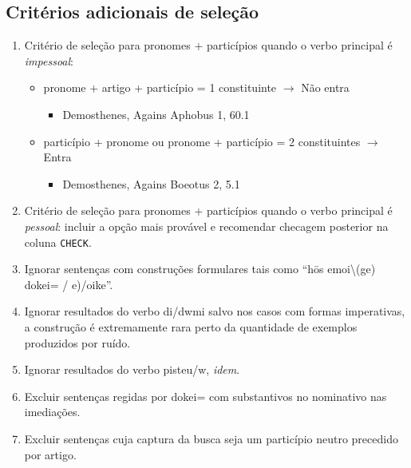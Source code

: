 \hypertarget{crituxe9rios-adicionais-de-seleuxe7uxe3o}{%
\subsection{Critérios adicionais de
seleção}\label{crituxe9rios-adicionais-de-seleuxe7uxe3o}}

\begin{enumerate}
\def\labelenumi{\arabic{enumi}.}
\tightlist
\item
  Critério de seleção para pronomes + particípios quando o verbo
  principal é \emph{impessoal}:

  \begin{itemize}
  \tightlist
  \item
    pronome + artigo + particípio = 1 constituinte \(\rightarrow\) Não
    entra

    \begin{itemize}
    \tightlist
    \item
      Demosthenes, Agains Aphobus 1, 60.1
    \end{itemize}
  \item
    particípio + pronome ou pronome + particípio = 2 constituintes
    \(\rightarrow\) Entra

    \begin{itemize}
    \tightlist
    \item
      Demosthenes, Agains Boeotus 2, 5.1
    \end{itemize}
  \end{itemize}
\item
  Critério de seleção para pronomes + particípios quando o verbo
  principal é \emph{pessoal}: incluir a opção mais provável e recomendar
  checagem posterior na coluna \texttt{CHECK}.
\item
  Ignorar sentenças com construções formulares tais como ``hōs
  emoi\textbackslash(ge) dokei= / e)/oike''.
\item
  Ignorar resultados do verbo di/dwmi salvo nos casos com formas
  imperativas, a construção é extremamente rara perto da quantidade de
  exemplos produzidos por ruído.
\item
  Ignorar resultados do verbo pisteu/w, \emph{idem}.
\item
  Excluir sentenças regidas por dokei= com substantivos no nominativo
  nas imediações.
\item
  Excluir sentenças cuja captura da busca seja um particípio neutro
  precedido por artigo.
\end{enumerate}
